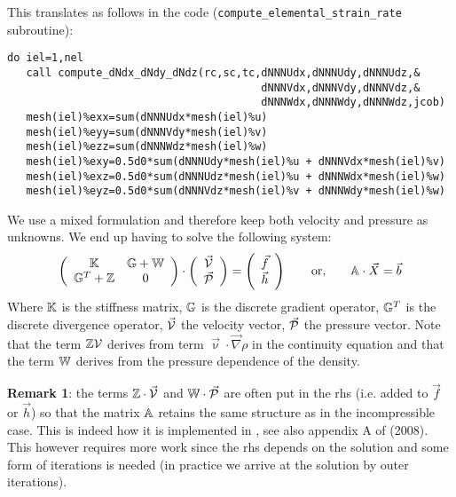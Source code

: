 \documentclass[a4paper,12pt]{article}
\begin{document}
This translates as follows in the code ({\tt compute\_elemental\_strain\_rate} subroutine):
\begin{lstlisting}
do iel=1,nel
   call compute_dNdx_dNdy_dNdz(rc,sc,tc,dNNNUdx,dNNNUdy,dNNNUdz,&
                                        dNNNVdx,dNNNVdy,dNNNVdz,&
                                        dNNNWdx,dNNNWdy,dNNNWdz,jcob)
   mesh(iel)%exx=sum(dNNNUdx*mesh(iel)%u)
   mesh(iel)%eyy=sum(dNNNVdy*mesh(iel)%v)
   mesh(iel)%ezz=sum(dNNNWdz*mesh(iel)%w)
   mesh(iel)%exy=0.5d0*sum(dNNNUdy*mesh(iel)%u + dNNNVdx*mesh(iel)%v)
   mesh(iel)%exz=0.5d0*sum(dNNNUdz*mesh(iel)%u + dNNNWdx*mesh(iel)%w)
   mesh(iel)%eyz=0.5d0*sum(dNNNVdz*mesh(iel)%v + dNNNWdy*mesh(iel)%w)
\end{lstlisting}

















\newpage


We use a mixed formulation and therefore  
keep both velocity and pressure as unknowns. We end up having to solve 
the following system:
\[
\left(
\begin{array}{cc}
{\mathbb{K}} & {\mathbb{G}}+{\mathbb{W}} \\ {\mathbb{G}}^T+{\mathbb{Z}} & 0 
\end{array}
\right)
\cdot
\left(
\begin{array}{c}
\vec{\cal V} \\ \vec{\cal P}
\end{array}
\right)
=
\left(
\begin{array}{c}
\vec{f} \\ \vec{h}
\end{array}
\right)
\quad\quad
{\rm or,}
\quad\quad
{\mathbb{A}} \cdot \vec{X} = \vec{b}
\]
Where ${\mathbb{K}}$ is the stiffness matrix, ${\mathbb{G}}$ is the discrete gradient operator, 
${\mathbb{G}}^T$ is the discrete divergence operator, $\vec{\cal V}$ the velocity vector, 
$\vec{\cal P}$ the pressure vector.
Note that the term ${\mathbb{Z}}{\cal V}$ derives from term ${\vec\upnu} \cdot {\vec \nabla} \rho$ in the continuity equation
and that the term ${\mathbb{W}}$ derives from the pressure dependence of the density.

 
{\bf Remark 1}: the terms ${\mathbb{Z}}\cdot \vec{\cal V}$ and ${\mathbb{W}}\cdot \vec{\cal P}$ are 
often put in the rhs (i.e. added to $\vec{f}$ or $\vec{h}$) so that 
the matrix ${\mathbb{A}}$ retains the same structure as in the incompressible case. This is indeed 
how it is implemented in \aspect, see also appendix A of \textcite{lezh08} (2008). 
This however requires more work since the rhs depends 
on the solution and some form of iterations is needed (in practice we arrive at the 
solution by outer iterations). 
\end{document}
